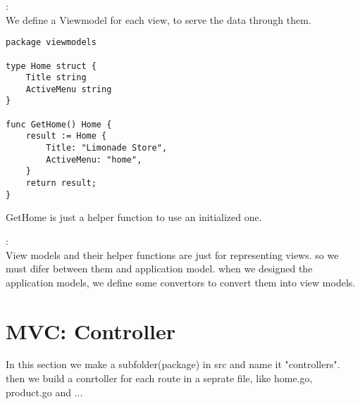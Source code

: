 \begin{note}[Viewmodels]:\\
We define a Viewmodel for each view, to serve the data through them.
\begin{lstlisting}[language=Golang]
package viewmodels

type Home struct {
	Title string
	ActiveMenu string
}

func GetHome() Home {
	result := Home {
		Title: "Limonade Store",
		ActiveMenu: "home",
	}
	return result;
}
\end{lstlisting}
GetHome is just a helper function to use an initialized one.
\end{note}
\begin{note}:\\
View models and their helper functions are just for representing views. so we must difer between them and application model. when we designed the application models, we define some convertors to convert them into view models.
\end{note}
\section{MVC: Controller}
In this section we make a subfolder(package) in src and name it "controllers". then we build a conrtoller for each route in a seprate file, like home.go, product.go and ...

